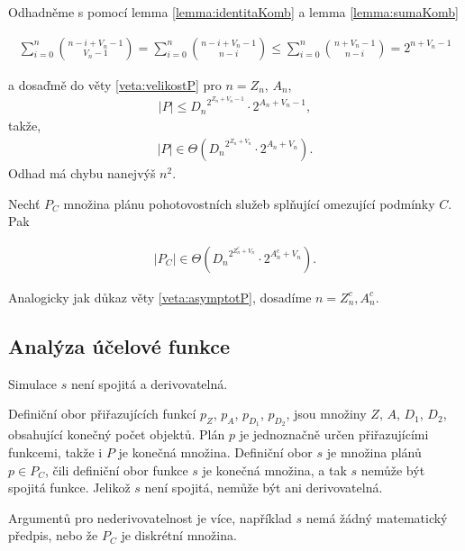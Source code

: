 \begin{dukaz}
  Odhadněme s pomocí lemma \ref{lemma:identitaKomb} a lemma \ref{lemma:sumaKomb}

  \begin{align*}
    \sum_{i=0}^{n} \binom{n - i + V_n - 1}{V_n - 1} =
    \sum_{i=0}^{n} \binom{n - i + V_n - 1}{n - i} \leq
    \sum_{i=0}^{n} \binom{n + V_n - 1}{n - i} =
    2^{n + V_n - 1}
  \end{align*}

  a dosaďmě do věty \ref{veta:velikostP} pro $n = Z_n$, $A_n$,
  \begin{align*}
    |P| \leq {D_n}^{2^{Z_n + V_n - 1}} \cdot 2^{A_n + V_n - 1},
  \end{align*}
  takže,
  \begin{align*}
    |P| \in \Theta({D_n}^{2^{Z_n + V_n}} \cdot 2^{A_n + V_n}).
  \end{align*}
  Odhad má chybu nanejvýš $n^2$.
\end{dukaz}

\begin{veta}\label{veta:PCvelikost}
  Nechť $P_C$ množina plánu pohotovostních služeb splňující omezující podmínky $C$. Pak 

  \begin{align*}
    |P_C| \in \Theta({D_n}^{2^{Z^c_n + V_n}} \cdot 2^{A^c_n + V_n}).
  \end{align*}
\end{veta}

\begin{dukaz}
  Analogicky jak důkaz věty \ref{veta:asymptotP}, dosadíme $n = Z^c_n, A^c_n$.
\end{dukaz}

\subsection{Analýza účelové funkce}\label{kap:analVicF}

\begin{veta}\label{veta:vlastnostiSim}
  Simulace $s$ není spojitá a derivovatelná.
\end{veta}

\begin{dukaz}
  Definiční obor přiřazujících funkcí $p_Z$, $p_A$, $p_{D_{1}}$, $p_{D_{2}}$, jsou množiny $Z$, $A$, $D_1$, $D_2$, obsahující konečný počet objektů.
  Plán $p$ je jednoznačně určen přiřazujícími funkcemi, takže i $P$ je konečná množina.
  Definiční obor $s$ je množina plánů $p \in P_C$, čili definiční obor funkce $s$ je konečná množina, a tak $s$ nemůže být spojitá funkce.
  Jelikož $s$ není spojitá, nemůže být ani derivovatelná.

  Argumentů pro nederivovatelnost je více, například $s$ nemá žádný matematický předpis, nebo že $P_C$ je diskrétní množina.
\end{dukaz}

